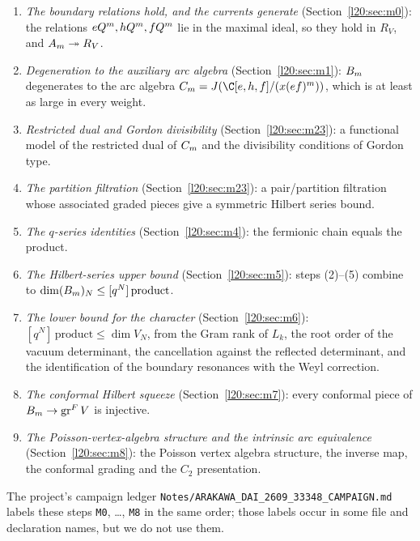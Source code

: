 \begin{enumerate}
\item[(1)] \emph{The boundary relations hold, and the currents generate} (Section~\ref{l20:sec:m0}): the relations
  $eQ^m, hQ^m, fQ^m$ lie in the maximal ideal, so they hold in $R_V$, and
  $A_m\twoheadrightarrow R_V$.
\item[(2)] \emph{Degeneration to the auxiliary arc algebra} (Section~\ref{l20:sec:m1}): $B_m$ degenerates to
  the arc algebra $\ltwentyCm=J(\C[e,h,f]/(x(ef)^m))$, which is at least as large in every weight.
\item[(3)] \emph{Restricted dual and Gordon divisibility} (Section~\ref{l20:sec:m23}): a functional model of the
  restricted dual of $C_m$ and the divisibility conditions of Gordon type.
\item[(4)] \emph{The partition filtration} (Section~\ref{l20:sec:m23}): a pair/partition filtration whose
  associated graded pieces give a symmetric Hilbert series bound.
\item[(5)] \emph{The $q$-series identities} (Section~\ref{l20:sec:m4}): the fermionic chain equals the product.
\item[(6)] \emph{The Hilbert-series upper bound} (Section~\ref{l20:sec:m5}): steps (2)--(5) combine to
  $\dim(B_m)_N\le[q^N]\,\text{product}$.
\item[(7)] \emph{The lower bound for the character} (Section~\ref{l20:sec:m6}): $[q^N]\,\text{product}\le\dim V_N$,
  from the Gram rank of $L_k$, the root order of the vacuum determinant, the cancellation against the reflected
  determinant, and the identification of the boundary resonances with the Weyl correction.
\item[(8)] \emph{The conformal Hilbert squeeze} (Section~\ref{l20:sec:m7}): every conformal piece of
  $B_m\to\operatorname{gr}^F V$ is injective.
\item[(9)] \emph{The Poisson-vertex-algebra structure and the intrinsic arc equivalence}
  (Section~\ref{l20:sec:m8}): the Poisson vertex algebra structure, the inverse map, the conformal grading and the
  $C_2$ presentation.
\end{enumerate}
The project's campaign ledger \texttt{Notes/ARAKAWA\_DAI\_2609\_33348\_CAMPAIGN.md} labels these steps
\texttt{M0}, \ldots, \texttt{M8} in the same order; those labels occur in some file and declaration names, but we do
not use them.


